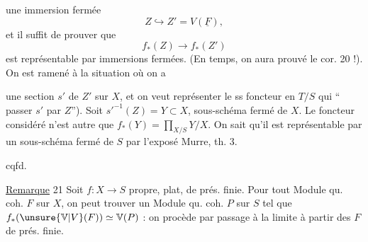 une immersion fermée
\[
 Z\hookrightarrow Z'=V(\underline F),
\]
et il suffit de prouver que
\[
 f_*(Z)\longrightarrow f_*(Z')
\]
est représentable par immersions fermées. (En  temps, on aura prouvé le cor. 20 !). On est ramené à la situation où on a


une section $s'$ de $Z'$ sur $X$, et on veut représenter le ss foncteur  en $T/S$ qui  `` passer $s'$ par $Z$''). Soit $s'^{-1}(Z)=Y\subset X$, sous-schéma fermé de $X$.  Le foncteur considéré n'est autre que $f_*(Y)=\displaystyle\prod_{X/S}Y/X$. On sait qu'il est représentable par un sous-schéma fermé de $S$ par l'exposé Murre, th. 3.

\begin{center}cqfd.\end{center}

\uline{Remarque} 21 Soit $f:X\longrightarrow S$ propre, plat, de prés. finie. Pour tout Module qu. coh. $F$ sur $X$, on peut trouver un Module qu. coh. $P$ sur $S$ tel que $f_*(\unsure{\mathbb V|V}(F))\simeq \mathbb V(P)$ : on procède par passage à la limite à partir des $F$ de prés. finie.
